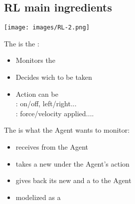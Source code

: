 \documentclass[12pt,serif,mathserif,compress]{beamer}
\begin{document}
\subsection{RL main ingredients}

\begin{frame}
  \begin{tcolorbox}[title=RL main ingredients,fonttitle=\Large]
    
    \texttt{[image: images/RL-2.png]}
    
      \bigskip
      \centering{}
  \end{tcolorbox}  
\end{frame}

\begin{frame}
  \begin{tcolorbox}[title=RL:  \textbf{Agent} -- Environnement]
    The  is the :
    \begin{itemize}
    \item <2-> Monitors the 
    \item <3-> Decides wich  to be taken
    \item <4-> Action can be\\
      : on/off, left/right...\\
      : force/velocity applied....
    \end{itemize}
  \end{tcolorbox}
  \bigskip
\end{frame}

\begin{frame}
  \begin{tcolorbox}[title=RL: Agent -- \textbf{Environnement}]
    The  is what the Agent wants to monitor:    
    \begin{itemize}
    \item <2-> receives  from the Agent
    \item <3-> takes a new  under the Agent's action
    \item <4-> gives back its new  and a  to the Agent
    \item <5-> modelized as a 
    \end{itemize}    
  \end{tcolorbox}
\end{frame}
\end{document}
